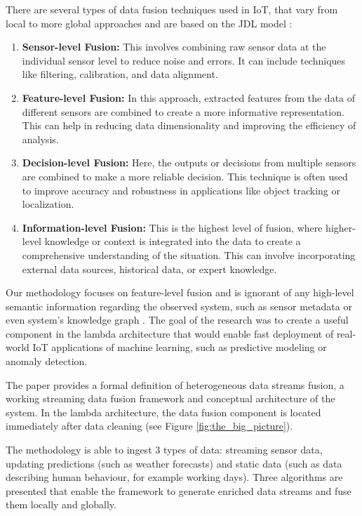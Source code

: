 There are several types of data fusion techniques used in IoT, that vary from local to more global approaches and are based on the JDL model \cite{hall:2001:multisensor}:
\begin{enumerate}
    \item \textbf{Sensor-level Fusion:} This involves combining raw sensor data at the individual sensor level to reduce noise and errors. It can include techniques like filtering, calibration, and data alignment.
    
    \item \textbf{Feature-level Fusion:} In this approach, extracted features from the data of different sensors are combined to create a more informative representation. This can help in reducing data dimensionality and improving the efficiency of analysis.
    
    \item \textbf{Decision-level Fusion:} Here, the outputs or decisions from multiple sensors are combined to make a more reliable decision. This technique is often used to improve accuracy and robustness in applications like object tracking or localization.
    
    \item \textbf{Information-level Fusion:} This is the highest level of fusion, where higher-level knowledge or context is integrated into the data to create a comprehensive understanding of the situation. This can involve incorporating external data sources, historical data, or expert knowledge.
\end{enumerate}

Our methodology focuses on feature-level fusion and is ignorant of any high-level semantic information regarding the observed system, such as sensor metadata or even system's knowledge graph \cite{kenda:2019:fusion}. 
The goal of the research was to create a useful component in the lambda architecture that would enable fast deployment of real-world IoT applications of machine learning, such as predictive modeling or anomaly detection.

The paper provides a formal definition of heterogeneous data streams fusion, a working streaming data fusion framework and conceptual architecture of the system.
In the lambda architecture, the data fusion component is located immediately after data cleaning (see Figure \ref{fig:the_big_picture}).

The methodology is able to ingest 3 types of data: streaming sensor data, updating predictions (such as weather forecasts) and static data (such as data describing human behaviour, for example working days).
Three algorithms are presented that enable the framework to generate enriched data streams and fuse them locally and globally.

